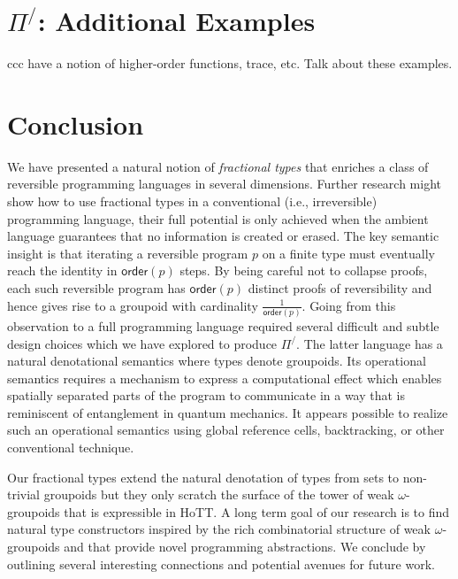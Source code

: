 \documentclass[a4paper,USenglish]{lipics-v2016-utf8x}
\newcommand{\ord}[1]{\ensuremath{\mathsf{order}(#1)}}
\begin{document}
\section{$\Pi^/$: Additional Examples}

ccc have a notion of higher-order functions, trace, etc. Talk about these examples.

\section{Conclusion}

We have presented a natural notion of \emph{fractional types} that enriches a
class of reversible programming languages in several dimensions.  Further
research might show how to use fractional types in a conventional (i.e.,
irreversible) programming language, their full potential is only achieved when
the ambient language guarantees that no information is created or erased. The
key semantic insight is that iterating a reversible program $p$ on a finite type
must eventually reach the identity in $\ord{p}$ steps. By being careful not to
collapse proofs, each such reversible program has $\ord{p}$ distinct proofs of
reversibility and hence gives rise to a groupoid with cardinality
$\frac{1}{\ord{p}}$. Going from this observation to a full programming language
required several difficult and subtle design choices which we have explored to
produce $\Pi^/$. The latter language has a natural denotational semantics where
types denote groupoids. Its operational semantics requires a mechanism to
express a computational effect which enables spatially separated parts of the
program to communicate in a way that is reminiscent of entanglement in quantum
mechanics. It appears possible to realize such an operational semantics using
global reference cells, backtracking, or other conventional technique.

Our fractional types extend the natural denotation of types from sets to
non-trivial groupoids but they only scratch the surface of the tower of weak
$\omega$-groupoids that is expressible in HoTT. A long term goal of our research
is to find natural type constructors inspired by the rich combinatorial
structure of weak $\omega$-groupoids and that provide novel programming
abstractions. We conclude by outlining several interesting connections and
potential avenues for future work.
\end{document}
